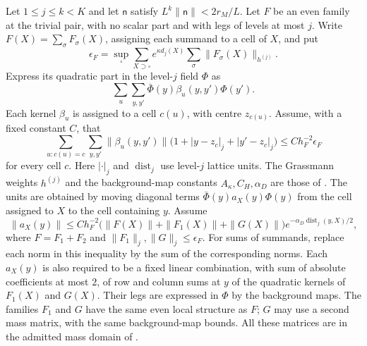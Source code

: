 \documentclass[11pt,letterpaper,reqno]{amsart}
\makeatletter
\theoremstyle{definition}
\newcommand{\ms@minorstart}{%
  \pushQED{\qed}\renewcommand{\qedsymbol}{$\blacksquare$}}
\newenvironment{lemma}[1][]{\ms@minorstart\ms@lemma[#1]}
  {\popQED\endms@lemma}
\theoremstyle{remark}
\makeatother
\begin{document}
\begin{lemma}\label{C-415-9}
Let $1\le j\le k<K$ and let $\mathsf n$ satisfy
$L^k\|\mathsf n\|<2r_M/L$.
Let $F$ be an even family at the trivial pair, with no
scalar part and with legs of levels at most $j$. Write
$F(X)=\sum_\sigma F_\sigma(X)$, assigning each summand to a
cell of $X$, and put
\[
 \epsilon_F=\sup_\square\sum_{X\supset\square}
 e^{\kappa d_j(X)}\sum_\sigma\|F_\sigma(X)\|_{h^{(j)}}.
\]
Express its quadratic part in the level-$j$ field $\Phi$ as
\[
 \sum_u\sum_{y,y'}\bar\Phi(y)\beta_u(y,y')\Phi(y').
\]
Each kernel $\beta_u$ is assigned to a cell $c(u)$, with
centre $z_{c(u)}$. Assume, with a fixed constant $C$, that
\begin{equation}\label{eq:qcdm2-cell-unit-bound}
 \sum_{u:c(u)=c}\sum_{y,y'}\|\beta_u(y,y')\|
 \bigl(1+|y-z_c|_j+|y'-z_c|_j\bigr)
 \le Ch_F^{-2}\epsilon_F
\end{equation}
for every cell $c$. Here $|\cdot|_j$ and
$\operatorname{dist}_j$ use level-$j$ lattice units.
The Grassmann weights $h^{(j)}$ and the background-map
constants $A_\kappa,C_H,\alpha_D$ are those of
\cite[Lem. 7.9]{QCDM1}.
The units are obtained by moving
diagonal terms $\bar\Phi(y)a_X(y)\Phi(y)$ from the cell
assigned to $X$ to the cell containing $y$. Assume
\begin{equation}\label{eq:qcdm2-moved-diagonal-bound}
 \|a_X(y)\|\le Ch_F^{-2}
 \bigl(\|F(X)\|+\|F_1(X)\|+\|G(X)\|\bigr)
 e^{-\alpha_D\operatorname{dist}_j(y,X)/2},
\end{equation}
where $F=F_1+F_2$ and $\|F_1\|_j,\|G\|_j\le\epsilon_F$.
For sums of summands, replace each norm in this inequality
by the sum of the corresponding norms. Each $a_X(y)$ is
also required to be a fixed linear combination, with sum
of absolute coefficients at most $2$, of row and column
sums at $y$ of the quadratic kernels of $F_1(X)$ and
$G(X)$. Their legs are expressed in $\Phi$ by the background
maps. The families $F_1$ and $G$ have the same even local
structure as $F$; $G$ may use a second mass matrix, with
the same background-map bounds. All these matrices are
in the admitted mass domain of
\cite[Lem. 7.9]{QCDM1}.


\end{lemma}
\end{document}
